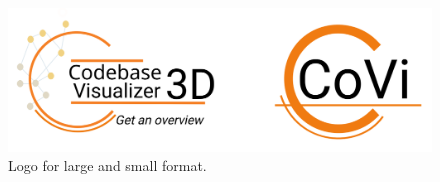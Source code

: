 \begin{figure}[H]
    \centering
    \includegraphics[width=\textwidth]{inc/images/CodeVis3D_logos.png}
    \caption{Logo for large and small format.}
    \label{fig:logos}
\end{figure}